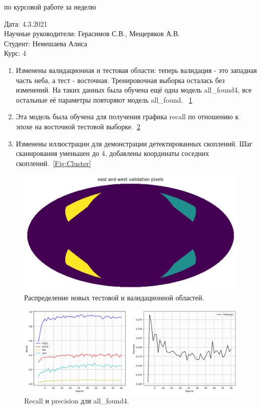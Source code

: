 \documentclass{article}
\begin{document}
\begin{center}{ по курсовой работе за неделю\\}\end{center}
Дата: 4.3.2021\\
Научные руководители: Герасимов С.В., Мещеряков А.В.\\
Студент: Немешаева Алиса\\
Курс: 4\\

\renewcommand{\labelitemi}{$\blacksquare$}
\renewcommand\labelitemii{$\square$}
\begin{enumerate}
    \item Изменены валидационная и тестовая области: теперь валидация - это западная часть неба, 
        а тест - восточная. Тренировочная выборка осталась без изменений. На таких данных была 
        обучена ещё одна модель all\_found4, все остальные её параметры повторяют модель all\_found.
        ~\ref{Fig:Val}\\
    \item Эта модель была обучена для получения графика recall по отношению к эпохе на восточной 
        тестовой выборке.~\ref{Fig:Recall}{}\\
    \item Изменены иллюстрации для демонстрации детектированных скоплений. Шаг сканирования 
        уменьшен до 4, добавлены координаты соседних скоплений.~\ref{Fig:Cluster}\\
\end{enumerate}




\begin{figure}[h]
\includegraphics[width=0.6\linewidth]{val}
\caption{Распределение новых тестовой и валидационной областей.}
\label{Fig:Val}
\end{figure}

\begin{figure}[h]
\includegraphics[width=0.8\linewidth]{recall}
\caption{Recall и precision для all\_found4.}
\label{Fig:Recall}
\end{figure}
\end{document}
